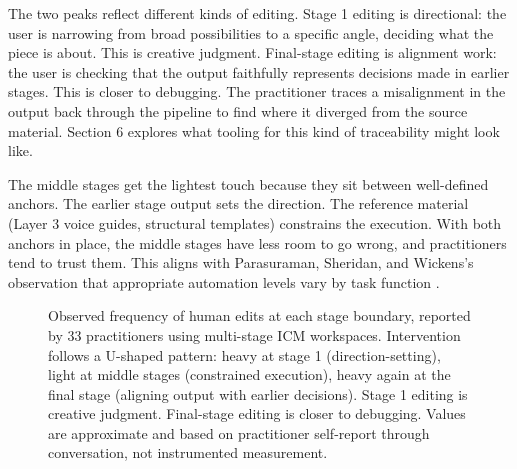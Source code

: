 \documentclass[acmlarge,nonacm,screen]{acmart}
\begin{document}
The two peaks reflect different kinds of editing. Stage 1 editing is directional: the user is narrowing from broad possibilities to a specific angle, deciding what the piece is about. This is creative judgment. Final-stage editing is alignment work: the user is checking that the output faithfully represents decisions made in earlier stages. This is closer to debugging. The practitioner traces a misalignment in the output back through the pipeline to find where it diverged from the source material. Section 6 explores what tooling for this kind of traceability might look like.

The middle stages get the lightest touch because they sit between well-defined anchors. The earlier stage output sets the direction. The reference material (Layer 3 voice guides, structural templates) constrains the execution. With both anchors in place, the middle stages have less room to go wrong, and practitioners tend to trust them. This aligns with Parasuraman, Sheridan, and Wickens's observation that appropriate automation levels vary by task function \cite{parasuraman2000}.

\begin{figure}[t]
\centering
{}
\caption{Observed frequency of human edits at each stage boundary, reported by 33 practitioners using multi-stage ICM workspaces. Intervention follows a U-shaped pattern: heavy at stage 1 (direction-setting), light at middle stages (constrained execution), heavy again at the final stage (aligning output with earlier decisions). Stage 1 editing is creative judgment. Final-stage editing is closer to debugging. Values are approximate and based on practitioner self-report through conversation, not instrumented measurement.}
\label{fig:intervention}
\end{figure}
\end{document}
